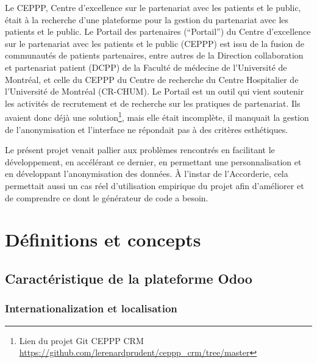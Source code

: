 


Le CEPPP, Centre d’excellence sur le partenariat avec les patients et le public, était à la recherche d'une plateforme pour la gestion du partenariat avec les patients et le public. Le Portail des partenaires (“Portail”) du Centre d’excellence sur le partenariat avec les patients et le public (CEPPP) est issu de la fusion de communautés de patients partenaires, entre autres de la Direction collaboration et partenariat patient (DCPP) de la Faculté de médecine de l’Université de Montréal, et celle du CEPPP du Centre de recherche du Centre Hospitalier de l’Université de Montréal (CR-CHUM). Le Portail est un outil qui vient soutenir les activités de recrutement et de recherche sur les pratiques de partenariat. Ils avaient donc déjà une solution\footnote{Lien du projet Git CEPPP CRM \url{https://github.com/lerenardprudent/ceppp_crm/tree/master}}, mais elle était incomplète, il manquait la gestion de l'anonymisation et l'interface ne répondait pas à des critères esthétiques.

Le présent projet venait pallier aux problèmes rencontrés en facilitant le développement, en accélérant ce dernier, en permettant une personnalisation et en développant l'anonymisation des données. À l'instar de l'Accorderie, cela permettait aussi un cas réel d'utilisation empirique du projet afin d'améliorer et de comprendre ce dont le générateur de code a besoin. 




\section{Définitions et concepts}

\subsection{Caractéristique de la plateforme Odoo}


\subsubsection{Internationalization et localisation}

